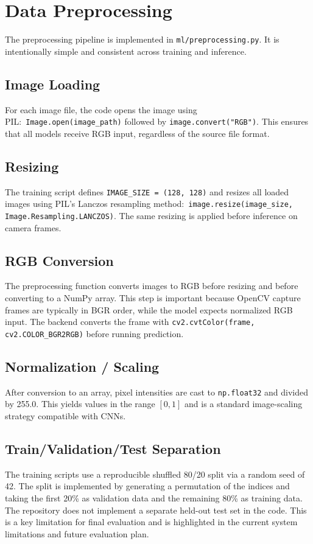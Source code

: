 \documentclass[11pt,a4paper]{article}
\begin{document}
\section{Data Preprocessing}
The preprocessing pipeline is implemented in \texttt{ml/preprocessing.py}. It is intentionally simple and consistent across training and inference.

\subsection{Image Loading}
For each image file, the code opens the image using PIL:\
\texttt{Image.open(image\_path)} followed by \texttt{image.convert("RGB")}. This ensures that all models receive RGB input, regardless of the source file format.

\subsection{Resizing}
The training script defines \texttt{IMAGE\_SIZE = (128, 128)} and resizes all loaded images using PIL's Lanczos resampling method:\
\texttt{image.resize(image\_size, Image.Resampling.LANCZOS)}. The same resizing is applied before inference on camera frames.

\subsection{RGB Conversion}
The preprocessing function converts images to RGB before resizing and before converting to a NumPy array. This step is important because OpenCV capture frames are typically in BGR order, while the model expects normalized RGB input. The backend converts the frame with \texttt{cv2.cvtColor(frame, cv2.COLOR\_BGR2RGB)} before running prediction.

\subsection{Normalization / Scaling}
After conversion to an array, pixel intensities are cast to \texttt{np.float32} and divided by 255.0. This yields values in the range $[0,1]$ and is a standard image-scaling strategy compatible with CNNs.

\subsection{Train/Validation/Test Separation}
The training scripts use a reproducible shuffled 80/20 split via a random seed of 42. The split is implemented by generating a permutation of the indices and taking the first 20\% as validation data and the remaining 80\% as training data. The repository does not implement a separate held-out test set in the code. This is a key limitation for final evaluation and is highlighted in the current system limitations and future evaluation plan.
\end{document}
